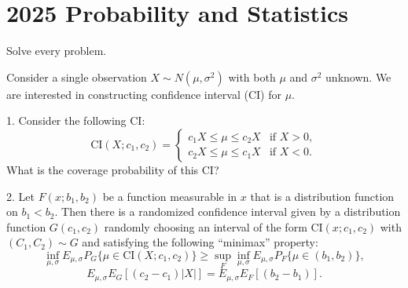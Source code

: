 \section{2025 Probability and Statistics}

Solve every problem.

\begin{exercise}\label{probability:2025:1}
Consider a single observation $X \sim N(\mu, \sigma^2)$ with both $\mu$ and $\sigma^2$ unknown. We are interested in constructing confidence interval (CI) for $\mu$.

1. Consider the following CI:
\[
\mathrm{CI}(X; c_1, c_2) = \begin{cases}
c_1 X \leq \mu \leq c_2 X & \text{if } X > 0, \\
c_2 X \leq \mu \leq c_1 X & \text{if } X < 0.
\end{cases}
\]
What is the coverage probability of this CI?

2. Let $F(x; b_1, b_2)$ be a function measurable in $x$ that is a distribution function on $b_1 < b_2$. Then there is a randomized confidence interval given by a distribution function $G(c_1, c_2)$ randomly choosing an interval of the form $\mathrm{CI}(x; c_1, c_2)$ with $(C_1, C_2) \sim G$ and satisfying the following ``minimax'' property:
\[
\inf_{\mu, \sigma} E_{\mu,\sigma} P_G\{\mu \in \mathrm{CI}(X; c_1, c_2)\} \geq \sup_F \inf_{\mu, \sigma} E_{\mu,\sigma} P_F\{\mu \in (b_1, b_2)\},
\]
\[
E_{\mu,\sigma} E_G[(c_2 - c_1)|X|] = E_{\mu,\sigma} E_F[(b_2 - b_1)].
\]

\end{exercise}

